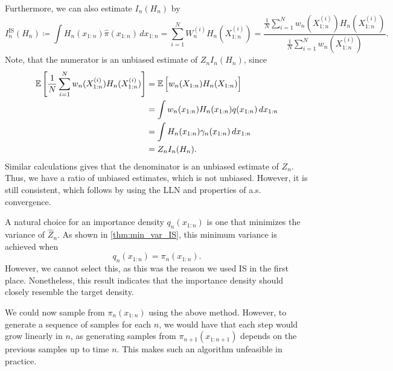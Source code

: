 \noindent Furthermore, we can also estimate $I_n(H_n)$ by
\[
I_n^{\text{IS}}(H_n) \coloneq \int H_n(x_{1:n})\widehat{\pi}(x_{1:n})\, dx_{1:n}=\sum_{i=1}^N W_n^{(i)}H_n(X_{1:n}^{(i)})=\frac{\frac{1}{N}\sum_{i=1}^{N}w_n(X_{1:n}^{(i)})H_n(X_{1:n}^{(i)})}{\frac{1}{N}\sum_{i=1}^{N}w_n(X_{1:n}^{(i)})}.
\]
Note, that the numerator is an unbiased estimate of $Z_nI_n(H_n)$, since
\begin{align*}
	\operatorname{\mathbb{E}}\left[\frac{1}{N}\sum_{i=1}^{N} w_n(X_{1:n}^{(i)})H_n(X_{1:n}^{(i)})\right] &= \operatorname{\mathbb{E}}\Big[w_n(X_{1:n})H_n(X_{1:n})\Big] \\
	&=\int w_n(x_{1:n})H_n(x_{1:n})q(x_{1:n})\, dx_{1:n} \\
	&=\int H_n(x_{1:n})\gamma_n(x_{1:n})\, dx_{1:n} \\
	&=Z_n I_n(H_n).
\end{align*}
Similar calculations gives that the denominator is an unbiased estimate of $Z_n$. Thus, we have a ratio of unbiased estimates, which is not unbiased. However, it is still consistent, which follows by using the \gls*{LLN} and properties of a.s. convergence. 


A natural choice for an importance density $q_n(x_{1:n})$ is one that minimizes the variance of $\widehat{Z}_n$. As shown in \cref{thm:min_var_IS}, this minimum variance is achieved when
\[
q_n(x_{1:n})=\pi_n(x_{1:n}).
\]
However, we cannot select this, as this was the reason we used \gls*{IS} in the first place. Nonetheless, this result indicates that the importance density should closely resemble the target density.

We could now sample from $\pi_n(x_{1:n})$ using the above method. However, to generate a sequence of samples for each $n$, we would have that each step would grow linearly in $n$, as generating samples from $\pi_{n+1}(x_{1:n+1})$ depends on the previous samples up to time $n$. This makes such an algorithm unfeasible in practice. 

